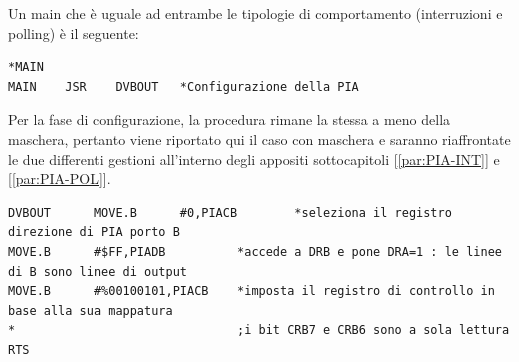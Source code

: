 Un main che è uguale ad entrambe le tipologie di comportamento (interruzioni e polling) è il seguente:
\begin{lstlisting}
*MAIN
MAIN	JSR    DVBOUT	*Configurazione della PIA
\end{lstlisting}

Per la fase di configurazione, la procedura rimane la stessa a meno della maschera, pertanto viene riportato qui il caso con maschera e saranno riaffrontate le due differenti gestioni all'interno degli appositi sottocapitoli [\ref{par:PIA-INT}] e [\ref{par:PIA-POL}].
\begin{lstlisting}
DVBOUT      MOVE.B      #0,PIACB		*seleziona il registro direzione di PIA porto B 
MOVE.B      #$FF,PIADB	  		*accede a DRB e pone DRA=1 : le linee di B sono linee di output	
MOVE.B      #%00100101,PIACB   	*imposta il registro di controllo in base alla sua mappatura
*								;i bit CRB7 e CRB6 sono a sola lettura	
RTS
\end{lstlisting}


